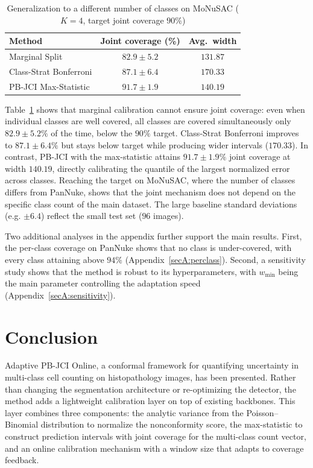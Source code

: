 \documentclass[smallextended,natbib]{svjour3}
\begin{document}
\begin{table}[!htbp]
\caption{Generalization to a different number of classes on MoNuSAC (\(K=4\), target
joint coverage \(90\%\))}
\label{tab:monusac}
\centering
\begin{tabular}{@{}lcc@{}}
\toprule
Method & Joint coverage (\%) & Avg.\ width \\
\midrule
Marginal Split & $82.9\pm5.2$ & $131.87$ \\
Class-Strat Bonferroni & $87.1\pm6.4$ & $170.33$ \\
PB-JCI Max-Statistic & $\mathbf{91.7\pm1.9}$ & $140.19$ \\
\bottomrule
\end{tabular}
\end{table}

Table~\ref{tab:monusac} shows that marginal calibration cannot ensure joint
coverage: even when individual classes are well covered, all classes are covered
simultaneously only $82.9\pm5.2\%$ of the time, below the \(90\%\) target.
Class-Strat Bonferroni improves to $87.1\pm6.4\%$ but stays below target while
producing wider intervals ($170.33$). In contrast, PB-JCI with the max-statistic
attains $91.7\pm1.9\%$ joint coverage at width $140.19$, directly calibrating the
quantile of the largest normalized error across classes. Reaching the target on
MoNuSAC, where the number of classes differs from PanNuke, shows that the joint
mechanism does not depend on the specific class count of the main dataset. The large
baseline standard deviations (e.g. $\pm6.4$) reflect the small test set ($96$
images).

Two additional analyses in the appendix further support the main results. First, the
per-class coverage on PanNuke shows that no class is under-covered, with every class
attaining above \(94\%\) (Appendix~\ref{secA:perclass}). Second, a sensitivity study
shows that the method is robust to its hyperparameters, with \(w_{\min}\) being the
main parameter controlling the adaptation speed (Appendix~\ref{secA:sensitivity}).

\section{Conclusion}\label{sec:conclusion}

Adaptive PB-JCI Online, a conformal framework for quantifying uncertainty in
multi-class cell counting on histopathology images, has been presented. Rather than
changing the segmentation architecture or re-optimizing the detector, the method
adds a lightweight calibration layer on top of existing backbones. This layer
combines three components: the analytic variance from the Poisson--Binomial
distribution to normalize the nonconformity score, the max-statistic to construct
prediction intervals with joint coverage for the multi-class count vector, and an
online calibration mechanism with a window size that adapts to coverage feedback.
\end{document}
